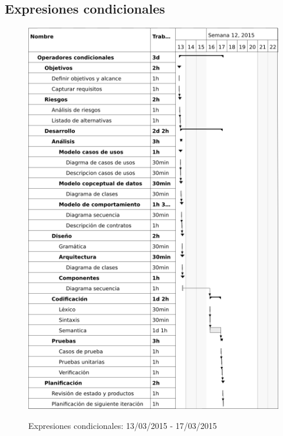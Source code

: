 \subsection{Expresiones condicionales}
\begin{center}
\begin{figure}[H]
\centering
\includegraphics[scale=1]{planning/16-expresiones-condicionales.png} \\
\caption{Expresiones condicionales: 13/03/2015 - 17/03/2015 }
\end{figure}
\end{center}

